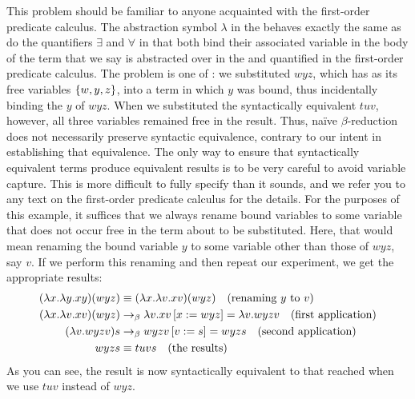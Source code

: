 This problem should be familiar to anyone acquainted with the first-order predicate calculus. The abstraction symbol $\lambda$ in the \lambdacalc behaves exactly the same as do the quantifiers $\exists$ and $\forall$ in that both bind their associated variable in the body of the term that we say is abstracted over in the \lambdacalc and quantified in the first-order predicate calculus. The problem is one of : we substituted $w y z$, which has as its free variables $\left\{ w, y, z \right\}$, into a term in which $y$ was bound, thus incidentally binding the $y$ of $w y z$. When we substituted the syntactically equivalent $t u v$, however, all three variables remained free in the result. Thus, na\"{i}ve $\beta$-re\-duc\-tion does not necessarily preserve syntactic equivalence, contrary to our intent in establishing that equivalence. The only way to ensure that syntactically equivalent terms produce equivalent results is to be very careful to avoid variable capture. This is more difficult to fully specify than it sounds, and we refer you to any text on the first-order predicate calculus for the details. For the purposes of this example, it suffices that we always rename bound variables to some variable that does not occur free in the term about to be substituted. Here, that would mean renaming the bound variable $y$ to some variable other than those of $w y z$, say $v$. If we perform this renaming and then repeat our experiment, we get the appropriate results:
\begin{align*}
(\lambda x. \lambda y. x y) (w y z) &\equiv (\lambda x. \lambda v. x v) (w y z) \quad \text{(renaming $y$ to $v$)}
\\
(\lambda x. \lambda v. x v) (w y z) &\betared \replace{x}{w y z}{\lambda v. xv} = \lambda v. w y z v
\quad \text{(first application)}
\\
(\lambda v. w y z v) s &\betared \replace{v}{s}{w y z v} = w y z s \quad \text{(second application)}
\\
w y z s &\equiv t u v s \quad \text{(the results)}
\end{align*}
As you can see, the result is now syntactically equivalent to that reached when we use $tuv$ instead of $wyz$.

